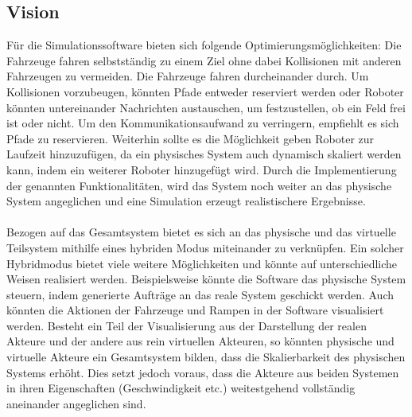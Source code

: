 \subsection{Vision}
Für die Simulationssoftware bieten sich folgende Optimierungsmöglichkeiten: Die Fahrzeuge fahren selbstständig zu einem Ziel ohne dabei Kollisionen mit anderen Fahrzeugen zu vermeiden. Die Fahrzeuge fahren durcheinander durch. Um Kollisionen vorzubeugen, könnten Pfade entweder reserviert werden oder Roboter könnten untereinander Nachrichten austauschen, um festzustellen, ob ein Feld frei ist oder nicht. Um den Kommunikationsaufwand zu verringern, empfiehlt es sich Pfade zu reservieren. Weiterhin sollte es die Möglichkeit geben Roboter zur Laufzeit hinzuzufügen, da ein physisches System auch dynamisch skaliert werden kann, indem ein weiterer Roboter hinzugefügt wird. Durch die Implementierung der genannten Funktionalitäten, wird das System noch weiter an das physische System angeglichen und eine Simulation erzeugt realistischere Ergebnisse.
\\\\
Bezogen auf das Gesamtsystem bietet es sich an das physische und das virtuelle Teilsystem mithilfe eines hybriden Modus miteinander zu verknüpfen. Ein solcher Hybridmodus bietet viele weitere Möglichkeiten und könnte auf unterschiedliche Weisen realisiert werden. Beispielsweise könnte die Software das physische System steuern, indem generierte Aufträge an das reale System geschickt werden. Auch könnten die Aktionen der Fahrzeuge und Rampen in der Software visualisiert werden. Besteht ein Teil der Visualisierung aus der Darstellung der realen Akteure und der andere aus rein virtuellen Akteuren, so könnten physische und virtuelle Akteure ein Gesamtsystem bilden, dass die Skalierbarkeit des physischen Systems erhöht. Dies setzt jedoch voraus, dass die Akteure aus beiden Systemen in ihren Eigenschaften (Geschwindigkeit etc.) weitestgehend vollständig aneinander angeglichen sind.




